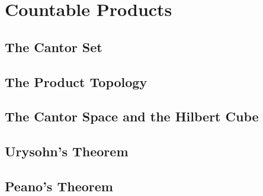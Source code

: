 \chapter{Countable Products}

\section{The Cantor Set}



\section{The Product Topology}



\section{The Cantor Space and the Hilbert Cube}



\section{Urysohn's Theorem}



\section{Peano's Theorem}


